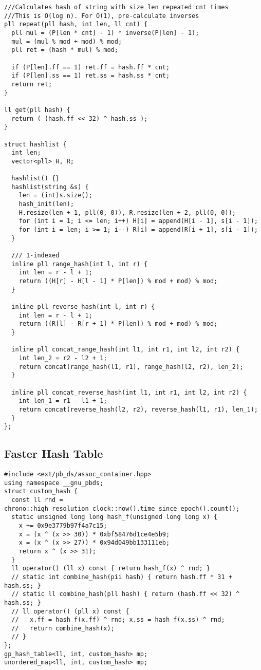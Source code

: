 \documentclass[10pt,a4paper,onesided]{article}
\begin{document}
\begin{multicols*}{3}
\begin{lstlisting}
///Calculates hash of string with size len repeated cnt times
///This is O(log n). For O(1), pre-calculate inverses
pll repeat(pll hash, int len, ll cnt) {
  pll mul = (P[len * cnt] - 1) * inverse(P[len] - 1);
  mul = (mul % mod + mod) % mod;
  pll ret = (hash * mul) % mod;

  if (P[len].ff == 1) ret.ff = hash.ff * cnt;
  if (P[len].ss == 1) ret.ss = hash.ss * cnt;
  return ret;
}

ll get(pll hash) {
  return ( (hash.ff << 32) ^ hash.ss );
}

struct hashlist {
  int len;
  vector<pll> H, R;

  hashlist() {}
  hashlist(string &s) {
    len = (int)s.size();
    hash_init(len);
    H.resize(len + 1, pll(0, 0)), R.resize(len + 2, pll(0, 0));
    for (int i = 1; i <= len; i++) H[i] = append(H[i - 1], s[i - 1]);
    for (int i = len; i >= 1; i--) R[i] = append(R[i + 1], s[i - 1]);
  }
  
  /// 1-indexed
  inline pll range_hash(int l, int r) {
    int len = r - l + 1;
    return ((H[r] - H[l - 1] * P[len]) % mod + mod) % mod;
  }

  inline pll reverse_hash(int l, int r) {
    int len = r - l + 1;
    return ((R[l] - R[r + 1] * P[len]) % mod + mod) % mod;
  }

  inline pll concat_range_hash(int l1, int r1, int l2, int r2) {
    int len_2 = r2 - l2 + 1;
    return concat(range_hash(l1, r1), range_hash(l2, r2), len_2);
  }

  inline pll concat_reverse_hash(int l1, int r1, int l2, int r2) {
    int len_1 = r1 - l1 + 1;
    return concat(reverse_hash(l2, r2), reverse_hash(l1, r1), len_1);
  }
};
\end{lstlisting}
\subsection{Faster Hash Table}
\begin{lstlisting}
#include <ext/pb_ds/assoc_container.hpp>
using namespace __gnu_pbds;
struct custom_hash {
  const ll rnd = chrono::high_resolution_clock::now().time_since_epoch().count();
  static unsigned long long hash_f(unsigned long long x) {
    x += 0x9e3779b97f4a7c15;
    x = (x ^ (x >> 30)) * 0xbf58476d1ce4e5b9;
    x = (x ^ (x >> 27)) * 0x94d049bb133111eb;
    return x ^ (x >> 31);
  }
  ll operator() (ll x) const { return hash_f(x) ^ rnd; }
  // static int combine_hash(pii hash) { return hash.ff * 31 + hash.ss; }
  // static ll combine_hash(pll hash) { return (hash.ff << 32) ^ hash.ss; }
  // ll operator() (pll x) const { 
  //   x.ff = hash_f(x.ff) ^ rnd; x.ss = hash_f(x.ss) ^ rnd;
  //   return combine_hash(x); 
  // }
};
gp_hash_table<ll, int, custom_hash> mp;
unordered_map<ll, int, custom_hash> mp;
\end{lstlisting}

\end{multicols*}
\end{document}

